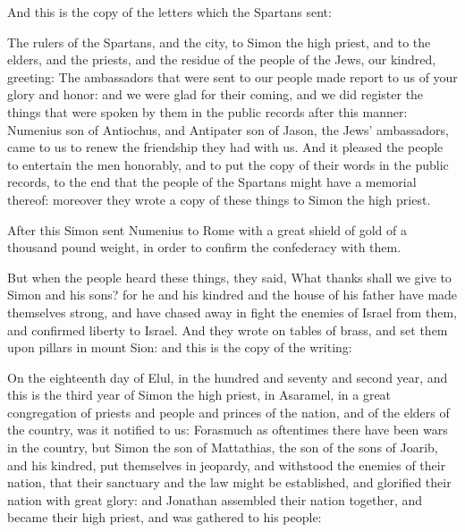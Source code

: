 {And this is the copy of the letters which the Spartans sent:
\par }{\PP The rulers of the Spartans, and the city, to Simon the high priest, and to the elders, and the priests, and the residue of the people of the Jews, our kindred, greeting:
The ambassadors that were sent to our people made report to us of your glory and honor: and we were glad for their coming,
and we did register the things that were spoken by them in the
 public records after this manner: Numenius son of Antiochus, and Antipater son of Jason, the Jews’ ambassadors, came to us to renew the friendship they had with us.
And it pleased the people to entertain the men honorably, and to put the copy of their words in the
 public records, to the end that the people of the Spartans might have a memorial thereof: moreover they wrote a copy of these things to Simon the high priest.
\par }{\PP {}After this Simon sent Numenius to Rome with a great shield of gold of a thousand pound weight, in order to confirm the confederacy with them.
\par }{\PP {}But when the people heard these things, they said, What thanks shall we give to Simon and his sons?
for he and his kindred and the house of his father have made themselves strong, and have chased away in fight the enemies of Israel from them, and confirmed liberty to
 Israel.
And they wrote on tables of brass, and set them upon pillars in mount Sion: and this is the copy of the writing:
\par }{\PP On the eighteenth day of Elul, in
 the hundred and seventy and second year, and this is the third year of Simon the high priest,
 in Asaramel, in a great congregation of priests and people and princes of the nation, and of the elders of the country,
 was it notified to us:
Forasmuch as oftentimes there have been wars in the country, but Simon the son of Mattathias, the son of the sons of Joarib, and his kindred, put themselves in jeopardy, and withstood the enemies of their nation, that their sanctuary and the law might be established, and glorified their nation with great glory:
and Jonathan assembled their nation together, and became their high priest, and was gathered to his people:
}
